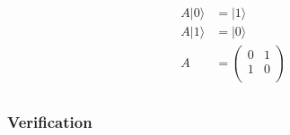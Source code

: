 \documentclass{article}
\begin{document}
\begin{equation}
    \begin{split}
        A|0\rangle & = |1\rangle \\
        A|1\rangle & = |0\rangle \\
        A & = \begin{pmatrix}
            0 & 1 \\
            1 & 0 \\
        \end{pmatrix} \\
    \end{split}
\end{equation}

\subsubsection{Verification}
\end{document}
